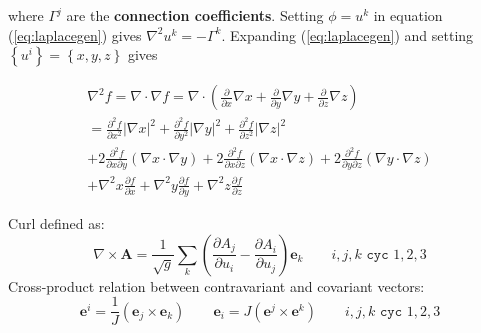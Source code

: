 \documentclass[12pt]{article}
\begin{document}
\noindent where $\Gamma^j$ are the {\bf connection coefficients}. Setting $\phi = u^k$ in equation (\ref{eq:laplacegen})
gives $\nabla^2u^k = -\Gamma^k$. Expanding (\ref{eq:laplacegen}) and setting $\left\{u^i\right\} = \left\{x, y, z\right\}$ gives

\begin{eqnarray}
\nabla^2f = \nabla\cdot\nabla f = \nabla\cdot\left(\frac{\partial}{\partial x}\nabla x + \frac{\partial}{\partial y}\nabla y + \frac{\partial}{\partial z}\nabla z\right) \nonumber \\
\label{eq:general_laplacian}
= \frac{\partial^2 f}{\partial x^2}\left|\nabla x\right|^2 + \frac{\partial^2 f}{\partial y^2}\left|\nabla y\right|^2 + \frac{\partial^2 f}{\partial z^2}\left|\nabla z\right|^2 \\
+2\frac{\partial^2 f}{\partial x\partial y}\left(\nabla x\cdot\nabla y\right)
+2\frac{\partial^2 f}{\partial x\partial z}\left(\nabla x\cdot\nabla z\right)
+2\frac{\partial^2 f}{\partial y\partial z}\left(\nabla y\cdot\nabla z\right) \nonumber \\
+\nabla^2x\frac{\partial f}{\partial x} +\nabla^2y\frac{\partial f}{\partial y} + \nabla^2z\frac{\partial f}{\partial z} \nonumber
\end{eqnarray}

Curl defined as:
\begin{equation}
\nabla\times\mathbf{A} = \frac{1}{\sqrt{g}}\sum_k\left(\frac{\partial A_j}{\partial u_i} - \frac{\partial A_i}{\partial u_j}\right)\mathbf{e}_k \qquad i,j,k \texttt{ cyc } 1,2,3
\label{eq:curl_def}
\end{equation}
Cross-product relation between contravariant and covariant vectors:
\begin{equation}
\mathbf{e}^i = \frac{1}{J}\left(\mathbf{e}_j \times \mathbf{e}_k\right) \qquad \mathbf{e}_i = J\left(\mathbf{e}^j \times \mathbf{e}^k\right) \qquad i,j,k \texttt{ cyc } 1,2,3
\label{eq:cross_relation}
\end{equation}
\end{document}
